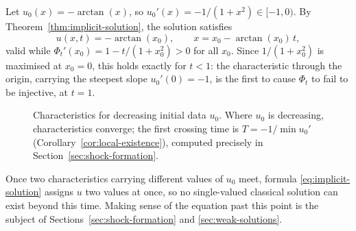 Let $u_0(x) = -\arctan(x)$, so $u_0'(x) = -1/(1+x^2) \in [-1,0)$. By
Theorem~\ref{thm:implicit-solution}, the solution satisfies
\begin{equation}
  u(x,t) = -\arctan(x_0), \qquad x = x_0 - \arctan(x_0)\, t,
\end{equation}
valid while $\Phi_t'(x_0) = 1 - t/(1+x_0^2) > 0$ for all $x_0$. Since
$1/(1+x_0^2)$ is maximised at $x_0=0$, this holds exactly for $t<1$: the
characteristic through the origin, carrying the steepest slope
$u_0'(0)=-1$, is the first to cause $\Phi_t$ to fail to be injective, at
$t=1$.

\begin{figure}[h]
\centering
{}
\caption{Characteristics for decreasing initial data $u_0$. Where $u_0$
is decreasing, characteristics converge; the first crossing time is
$T=-1/\min u_0'$ (Corollary~\ref{cor:local-existence}), computed
precisely in Section~\ref{sec:shock-formation}.}
\label{fig:characteristics}
\end{figure}

\begin{remark}
\label{rem:beyond-T}
Once two characteristics carrying different values of $u_0$ meet, formula
\eqref{eq:implicit-solution} assigns $u$ two values at once, so no
single-valued classical solution can exist beyond this time. Making sense
of the equation past this point is the subject of
Sections~\ref{sec:shock-formation} and \ref{sec:weak-solutions}.
\end{remark}